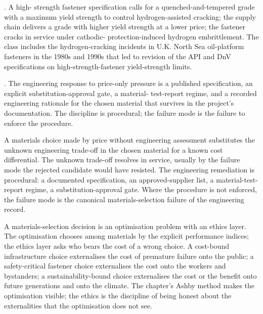 . A high-
strength fastener specification calls for a quenched-and-tempered
grade with a maximum yield strength to control hydrogen-assisted
cracking; the supply chain delivers a grade with higher yield strength
at a lower price; the fastener cracks in service under cathodic-
protection-induced hydrogen embrittlement. The class includes the
hydrogen-cracking incidents in U.K. North Sea oil-platform fasteners
in the 1980s and 1990s that led to revision of the API and DnV
specifications on high-strength-fastener yield-strength limits.

. The
engineering response to price-only pressure is a published
specification, an explicit substitution-approval gate, a material-
test-report regime, and a recorded engineering rationale for the
chosen material that survives in the project's documentation. The
discipline is procedural; the failure mode is the failure to enforce
the procedure.

\begin{principle}
A materials choice made by price without engineering assessment
substitutes the unknown engineering trade-off in the chosen material
for a known cost differential. The unknown trade-off resolves in
service, usually by the failure mode the rejected candidate would
have resisted. The engineering remediation is procedural: a
documented specification, an approved-supplier list, a material-test-
report regime, a substitution-approval gate. Where the procedure is
not enforced, the failure mode is the canonical materials-selection
failure of the engineering record.
\end{principle}

\begin{archetype}
A materials-selection decision is an optimisation problem with an
ethics layer. The optimisation chooses among materials by the
explicit performance indices; the ethics layer asks who bears the
cost of a wrong choice. A cost-bound infrastructure choice externalises
the cost of premature failure onto the public; a safety-critical
fastener choice externalises the cost onto the workers and bystanders;
a sustainability-bound choice externalises the cost or the benefit
onto future generations and onto the climate. The chapter's Ashby
method makes the optimisation visible; the ethics is the discipline
of being honest about the externalities that the optimisation does
not see.
\end{archetype}

